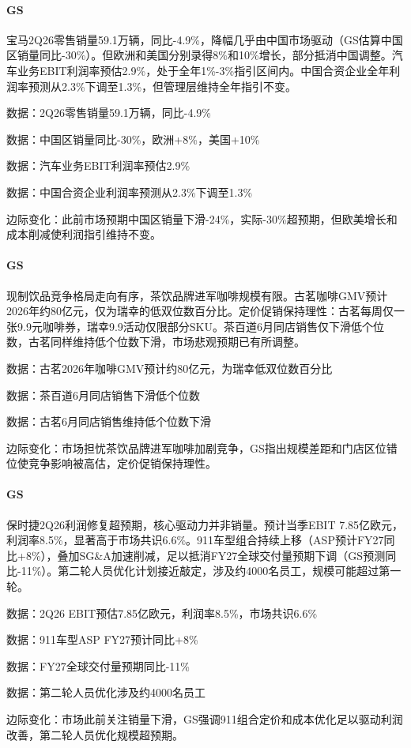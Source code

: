 \documentclass[11pt]{ctexart}
\begin{document}
\paragraph{GS} 宝马2Q26零售销量59.1万辆，同比-4.9\%，降幅几乎由中国市场驱动（GS估算中国区销量同比-30\%）。但欧洲和美国分别录得8\%和10\%增长，部分抵消中国调整。汽车业务EBIT利润率预估2.9\%，处于全年1\%-3\%指引区间内。中国合资企业全年利润率预测从2.3\%下调至1.3\%，但管理层维持全年指引不变。
{\small\color{refgray}数据：2Q26零售销量59.1万辆，同比-4.9\%\par}
{\small\color{refgray}数据：中国区销量同比-30\%，欧洲+8\%，美国+10\%\par}
{\small\color{refgray}数据：汽车业务EBIT利润率预估2.9\%\par}
{\small\color{refgray}数据：中国合资企业利润率预测从2.3\%下调至1.3\%\par}
{\small\color{refgray}边际变化：此前市场预期中国区销量下滑-24\%，实际-30\%超预期，但欧美增长和成本削减使利润指引维持不变。\par}
\paragraph{GS} 现制饮品竞争格局走向有序，茶饮品牌进军咖啡规模有限。古茗咖啡GMV预计2026年约80亿元，仅为瑞幸的低双位数百分比。定价促销保持理性：古茗每周仅一张9.9元咖啡券，瑞幸9.9活动仅限部分SKU。茶百道6月同店销售仅下滑低个位数，古茗同样维持低个位数下滑，市场悲观预期已有所调整。
{\small\color{refgray}数据：古茗2026年咖啡GMV预计约80亿元，为瑞幸低双位数百分比\par}
{\small\color{refgray}数据：茶百道6月同店销售下滑低个位数\par}
{\small\color{refgray}数据：古茗6月同店销售维持低个位数下滑\par}
{\small\color{refgray}边际变化：市场担忧茶饮品牌进军咖啡加剧竞争，GS指出规模差距和门店区位错位使竞争影响被高估，定价促销保持理性。\par}
\paragraph{GS} 保时捷2Q26利润修复超预期，核心驱动力并非销量。预计当季EBIT 7.85亿欧元，利润率8.5\%，显著高于市场共识6.6\%。911车型组合持续上移（ASP预计FY27同比+8\%），叠加SG\&A加速削减，足以抵消FY27全球交付量预期下调（GS预测同比-11\%）。第二轮人员优化计划接近敲定，涉及约4000名员工，规模可能超过第一轮。
{\small\color{refgray}数据：2Q26 EBIT预估7.85亿欧元，利润率8.5\%，市场共识6.6\%\par}
{\small\color{refgray}数据：911车型ASP FY27预计同比+8\%\par}
{\small\color{refgray}数据：FY27全球交付量预期同比-11\%\par}
{\small\color{refgray}数据：第二轮人员优化涉及约4000名员工\par}
{\small\color{refgray}边际变化：市场此前关注销量下滑，GS强调911组合定价和成本优化足以驱动利润改善，第二轮人员优化规模超预期。\par}
\end{document}
